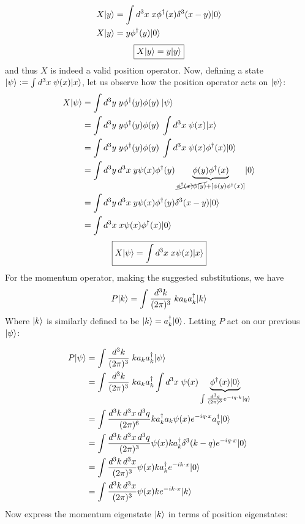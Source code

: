 \documentclass[12pt]{article}
\DeclarePairedDelimiter\ket{\lvert}{\rangle}
\begin{document}
\begin{align*}
    X\ket{y} &= \int d^3x \; x\phi^{\dagger}(x)\delta^3(x-y)\ket{0}\\
    X\ket{y} &= y\phi^{\dagger}(y)\ket{0}\\
\end{align*}
\begin{equation}
    \boxed{X\ket{y} = y\ket{y}}
\end{equation}
and thus $X$ is indeed a valid position operator. Now, defining a state $\ket{\psi} := \int d^3x \; \psi(x) \ket{x}$, let us observe how the position operator acts on $\ket{\psi}$:
\begin{align*}
    X\ket{\psi} &= \int d^3y \; y\phi^{\dagger}(y)\phi(y) \; \ket{\psi} \\
    &= \int d^3y \; y\phi^{\dagger}(y)\phi(y) \; \int d^3x \; \psi(x) \ket{x} \\
    &= \int d^3y \; y\phi^{\dagger}(y)\phi(y) \; \int d^3x \; \psi(x) \phi^{\dagger}(x)\ket{0} \\
    &= \int d^3y \, d^3x \; y\psi(x)\phi^{\dagger}(y)\underbrace{\phi(y)\phi^{\dagger}(x)}_{\cancel{\phi^{\dagger}(x)\phi(y)} + [\phi(y)\phi^{\dagger}(x)]}\ket{0} \\
    &= \int d^3y \, d^3x \; y\psi(x)\phi^{\dagger}(y)\delta^3(x-y)\ket{0}\\
    &= \int d^3x \; x\psi(x) \phi^{\dagger}(x)\ket{0}\\
\end{align*}
\begin{equation}
    \boxed{X\ket{\psi} = \int d^3x \; x\psi(x) \ket{x}}
\end{equation}
For the momentum operator, making the suggested substitutions, we have
\begin{equation*}
    P\ket{k} = \int \frac{d^3k}{(2\pi)^3} \;k a_ka^{\dagger}_k \ket{k}
\end{equation*}
Where $\ket{k}$ is similarly defined to be $\ket{k} = a^{\dagger}_k \ket{0}$. Letting $P$ act on our previous $\ket{\psi}$:

\begin{align*}
    P\ket{\psi} &= \int \frac{d^3k}{(2\pi)^3} \; k a_ka^{\dagger}_k \ket{\psi} \\
    &= \int \frac{d^3k}{(2\pi)^3} \;k a_ka^{\dagger}_k \int d^3x \; \psi(x) \underbrace{\phi^{\dagger}(x)\ket{0}}_{\int \frac{d^3q}{(2\pi)^3}e^{-iq\cdot k}\ket{q}}\\
    &= \int \frac{d^3k \, d^3x \, d^3q}{(2\pi)^6} ka^{\dagger}_k a_k \psi(x) e^{-iq \cdot x} a^{\dagger}_q \ket{0} \\
    &= \int \frac{d^3k \, d^3x \, d^3q}{(2\pi)^3} \psi(x) ka^{\dagger}_k \delta^3(k - q)e^{-iq \cdot x} \ket{0} \\
    &= \int \frac{d^3k \, d^3x}{(2\pi)^3} \psi(x) ka^{\dagger}_k e^{-ik \cdot x} \ket{0} \\
    &= \int \frac{d^3k \, d^3x}{(2\pi)^3} \psi(x) k e^{-ik \cdot x} \ket{k} \\
\end{align*}
Now express the momentum eigenstate \( \ket{k} \) in terms of position eigenstates:
\end{document}
